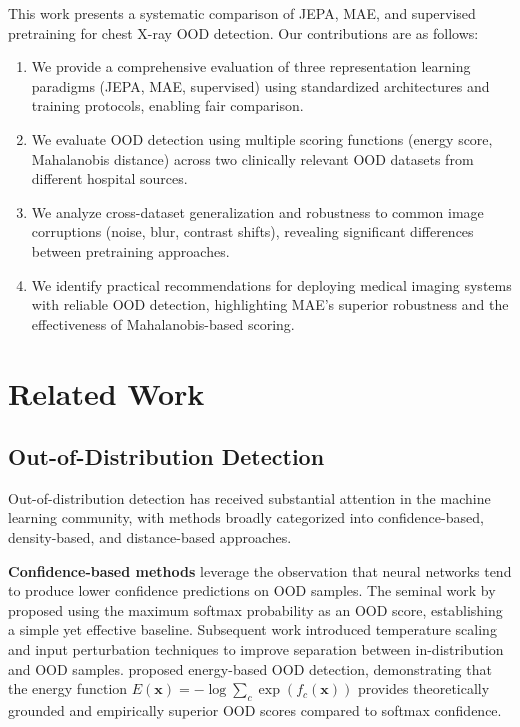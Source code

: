 \documentclass[11pt,a4paper]{article}
\begin{document}
This work presents a systematic comparison of JEPA, MAE, and supervised pretraining for chest X-ray OOD detection. Our contributions are as follows:

\begin{enumerate}[leftmargin=*]
    \item We provide a comprehensive evaluation of three representation learning paradigms (JEPA, MAE, supervised) using standardized architectures and training protocols, enabling fair comparison.
    
    \item We evaluate OOD detection using multiple scoring functions (energy score, Mahalanobis distance) across two clinically relevant OOD datasets from different hospital sources.
    
    \item We analyze cross-dataset generalization and robustness to common image corruptions (noise, blur, contrast shifts), revealing significant differences between pretraining approaches.
    
    \item We identify practical recommendations for deploying medical imaging systems with reliable OOD detection, highlighting MAE's superior robustness and the effectiveness of Mahalanobis-based scoring.
\end{enumerate}

\section{Related Work}

\subsection{Out-of-Distribution Detection}

Out-of-distribution detection has received substantial attention in the machine learning community, with methods broadly categorized into confidence-based, density-based, and distance-based approaches.

\textbf{Confidence-based methods} leverage the observation that neural networks tend to produce lower confidence predictions on OOD samples. The seminal work by \citet{hendrycks2017baseline} proposed using the maximum softmax probability as an OOD score, establishing a simple yet effective baseline. Subsequent work introduced temperature scaling \citep{guo2017calibration} and input perturbation techniques \citep{liang2018enhancing} to improve separation between in-distribution and OOD samples. \citet{liu2020energy} proposed energy-based OOD detection, demonstrating that the energy function $E(\mathbf{x}) = -\log \sum_c \exp(f_c(\mathbf{x}))$ provides theoretically grounded and empirically superior OOD scores compared to softmax confidence.
\end{document}
